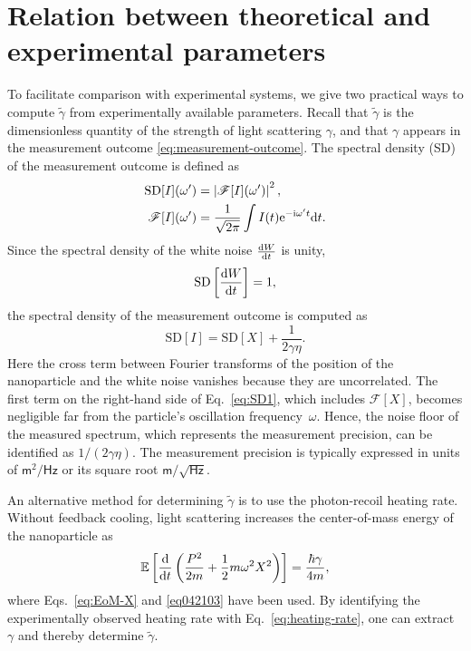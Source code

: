 \documentclass[aps,pra,superscriptaddress,twocolumn
]{revtex4-2}
\newcommand{\e}{\mathrm{e}}
\renewcommand{\i}{\mathrm{i}}
\renewcommand{\d}{{\rm d}}
\newcommand{\majrev}[1]{{#1}}
\begin{document}
\majrev{

\section{Relation between theoretical and experimental parameters}
 \label{sec:relation-btw-theory-expe}

To facilitate comparison with experimental systems, 
we give two practical ways to compute $\tilde \gamma$ 
from experimentally available parameters.
Recall that $\tilde{\gamma}$ is the dimensionless quantity of 
the strength of light scattering $\gamma$, and 
that $\gamma$ appears in the measurement outcome \eqref{eq:measurement-outcome}. 
The spectral density (SD) of the measurement outcome is defined as 
\begin{alignat}{1}
  \mathrm{SD}[I](\omega') &= \left| \mathscr{F} [I] (\omega') \right|^2, \\
  \mathscr{F}[I](\omega') &= \frac{1}{\sqrt{2\pi}}\int I(t) \e^{-\i\omega' t} \d t.
\end{alignat}
Since the spectral density of the white noise $\frac{\d W}{\d t}$ is unity, 
\begin{equation}
  \mathrm{SD}\left[\frac{\d W}{\d t}\right] = 1,
\end{equation}
the spectral density of the measurement outcome is computed as 
\begin{equation}
  \mathrm{SD}[I]
  = \mathrm{SD}[X]
  + \frac{1}{2\gamma \eta}. \label{eq:SD1}
\end{equation}
Here the cross term between Fourier transforms of
the position of the nanoparticle and the white noise vanishes 
because they are uncorrelated. 
The first term on the right-hand side of Eq.~\eqref{eq:SD1}, 
which includes $\mathscr{F}[X]$, 
becomes negligible far from the particle's oscillation frequency~$\omega$. 
Hence, the noise floor of the measured spectrum, 
which represents the measurement precision, 
can be identified as $1/(2\gamma\eta)$. 
The measurement precision is typically expressed in units of 
$\mathsf{m}^2/\mathsf{Hz}$ or its square root $\mathsf{m}/\sqrt{\mathsf{Hz}}$.

An alternative method for determining $\tilde{\gamma}$ 
is to use the photon-recoil heating rate. 
Without feedback cooling, 
light scattering increases the center-of-mass energy of the nanoparticle as
\begin{alignat}{1}
  \mathbb{E}\left[\frac{\d}{\d t} \left(
    \frac{P^2}{2m} + \frac{1}{2} m\omega^2 X^2 \right)
  \right]
  = \frac{\hbar \gamma}{4m},\label{eq:heating-rate}
\end{alignat}
where Eqs.~\eqref{eq:EoM-X} and \eqref{eq042103} have been used.
By identifying the experimentally observed heating rate 
with Eq.~\eqref{eq:heating-rate}, 
one can extract $\gamma$ and thereby determine $\tilde{\gamma}$.



}
\end{document}
